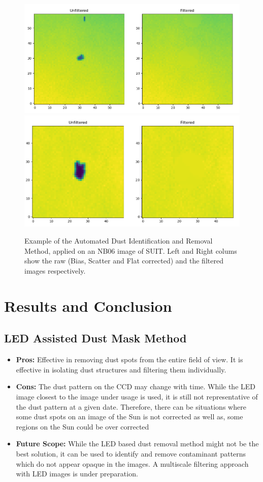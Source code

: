 \documentclass[11pt,a4paper]{article}
\begin{document}
		\begin{figure}
		\centering
		\includegraphics[width=0.7\linewidth]{pics/screenshot_2024-06-30_15-14-11.png}
		\includegraphics[width=0.7\linewidth]{pics/screenshot_2024-06-30_13-51-36.png}
		\caption{Example of the Automated Dust Identification and Removal Method, applied on an NB06 image of SUIT. Left and Right colums show the raw (Bias, Scatter and Flat corrected) and the filtered images respectively.}
		\label{fig:screenshot2024-06-2822-50-31}
	\end{figure}
	
	\section{Results and Conclusion}
	\subsection{LED Assisted Dust Mask Method}
	\begin{itemize}
		\item \textbf{Pros:} Effective in removing dust spots from the entire field of view.  It is effective in isolating dust structures and filtering them individually. 
		\item \textbf{Cons:} The dust pattern on the CCD may change with time. While the LED image closest to the image under usage is used, it is still not representative of the dust pattern at a given date. Therefore, there can be situations where some dust spots on an image of the Sun is not corrected as well as, some regions on the Sun could be over corrected
		\item \textbf{Future Scope:} While the LED based dust removal method might not be the best solution, it can be used to identify and remove contaminant patterns which do not appear opaque in the images. A multiscale filtering approach with LED images is under preparation.
	\end{itemize}
	
\end{document}
